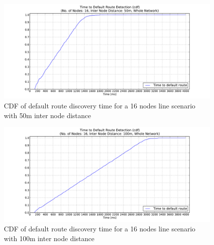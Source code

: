 \begin{figure}[htbp]
  \begin{center}
  \hspace{-20pt}
    \leavevmode
      \includegraphics[width=\textwidth]
      {Pics/results/16/MRHOF/line/dist50_montecarlo_cdf_hist.pdf}
   \caption{CDF of default route discovery time for a 16 nodes line scenario with 50m inter node distance}
   \label{fig:16_MRHOF_line_50_cdf}
  \end{center}
  \vspace{-10pt}
\end{figure}

\begin{figure}[htbp]
  \begin{center}
  \hspace{-20pt}
    \leavevmode
      \includegraphics[width=\textwidth]
      {Pics/results/16/MRHOF/line/dist100_montecarlo_cdf_hist.pdf}
   \caption{CDF of default route discovery time for a 16 nodes line scenario with 100m inter node distance}
   \label{fig:16_MRHOF_line_100_cdf}
  \end{center}
  \vspace{-10pt}
\end{figure}

